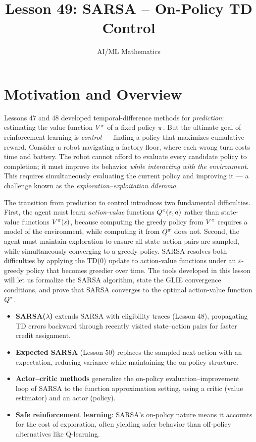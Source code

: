 \documentclass[11pt,a4paper]{article}
\title{Lesson 49: SARSA -- On-Policy TD Control}
\author{AI/ML Mathematics}
\date{}
\begin{document}
\maketitle
\tableofcontents
\newpage

\section{Motivation and Overview}
\label{sec:motivation}

Lessons 47 and 48 developed temporal-difference methods for
\emph{prediction}: estimating the value function $V^{\pi}$ of a fixed
policy $\pi$. But the ultimate goal of reinforcement learning is
\emph{control} --- finding a policy that maximizes cumulative reward.
Consider a robot navigating a factory floor, where each wrong turn
costs time and battery. The robot cannot afford to evaluate every
candidate policy to completion; it must improve its behavior
\emph{while interacting with the environment}. This requires
simultaneously evaluating the current policy and improving it --- a
challenge known as the \emph{exploration--exploitation dilemma}.

The transition from prediction to control introduces two fundamental
difficulties. First, the agent must learn \emph{action-value} functions
$Q^{\pi}(s,a)$ rather than state-value functions $V^{\pi}(s)$, because
computing the greedy policy from $V^{\pi}$ requires a model of the
environment, while computing it from $Q^{\pi}$ does not. Second, the
agent must maintain exploration to ensure all state--action pairs are
sampled, while simultaneously converging to a greedy policy. SARSA
resolves both difficulties by applying the TD(0) update to
action-value functions under an $\varepsilon$-greedy policy that
becomes greedier over time. The tools developed in this lesson will let
us formalize the SARSA algorithm, state the GLIE convergence
conditions, and prove that SARSA converges to the optimal
action-value function $Q^*$.

\begin{rlconnection}[title={Where SARSA and On-Policy Control Appear}]
\begin{itemize}[nosep]
  \item \textbf{SARSA($\lambda$)} extends SARSA with eligibility
    traces (Lesson 48), propagating TD errors backward through
    recently visited state--action pairs for faster credit assignment.
  \item \textbf{Expected SARSA} (Lesson 50) replaces the sampled
    next action with an expectation, reducing variance while
    maintaining the on-policy structure.
  \item \textbf{Actor--critic methods} generalize the on-policy
    evaluation--improvement loop of SARSA to the function approximation
    setting, using a critic (value estimator) and an actor (policy).
  \item \textbf{Safe reinforcement learning}: SARSA's on-policy
    nature means it accounts for the cost of exploration, often
    yielding safer behavior than off-policy alternatives like
    Q-learning.
\end{itemize}
\end{rlconnection}
\end{document}
